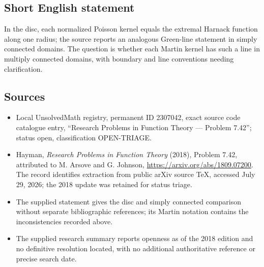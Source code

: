 \documentclass[11pt]{article}
\begin{document}
\subsection{Short English statement}
In the disc, each normalized Poisson kernel equals the extremal Harnack function along one radius; the source reports an analogous Green-line statement in simply connected domains. The question is whether each Martin kernel has such a line in multiply connected domains, with boundary and line conventions needing clarification.
\subsection{Sources}
\begin{itemize}
\item Local UnsolvedMath registry, permanent ID 2307042, exact source code catalogue entry, ``Research Problems in Function Theory --- Problem 7.42''; status open, classification OPEN-TRIAGE.
\item Hayman, \emph{Research Problems in Function Theory} (2018), Problem 7.42, attributed to M. Arsove and G. Johnson, \url{https://arxiv.org/abs/1809.07200}. The record identifies extraction from public arXiv source TeX, accessed July 29, 2026; the 2018 update was retained for status triage.
\item The supplied statement gives the disc and simply connected comparison without separate bibliographic references; its Martin notation contains the inconsistencies recorded above.
\item The supplied research summary reports openness as of the 2018 edition and no definitive resolution located, with no additional authoritative reference or precise search date.
\end{itemize}
\end{document}
